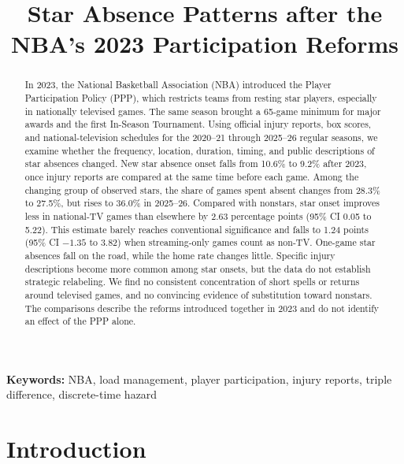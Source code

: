 \documentclass[11pt]{article}
\title{Star Absence Patterns after the NBA's 2023 Participation Reforms}
\author{}
\date{}
\begin{document}
\maketitle
\begin{abstract}
In 2023, the National Basketball Association (NBA) introduced the Player Participation Policy (PPP), which restricts teams from resting star players, especially in nationally televised games. The same season brought a 65-game minimum for major awards and the first In-Season Tournament. Using official injury reports, box scores, and national-television schedules for the 2020--21 through 2025--26 regular seasons, we examine whether the frequency, location, duration, timing, and public descriptions of star absences changed. New star absence onset falls from 10.6\% to 9.2\% after 2023, once injury reports are compared at the same time before each game. Among the changing group of observed stars, the share of games spent absent changes from 28.3\% to 27.5\%, but rises to 36.0\% in 2025--26. Compared with nonstars, star onset improves less in national-TV games than elsewhere by 2.63 percentage points (95\% CI 0.05 to 5.22). This estimate barely reaches conventional significance and falls to 1.24 points (95\% CI $-1.35$ to 3.82) when streaming-only games count as non-TV. One-game star absences fall on the road, while the home rate changes little. Specific injury descriptions become more common among star onsets, but the data do not establish strategic relabeling. We find no consistent concentration of short spells or returns around televised games, and no convincing evidence of substitution toward nonstars. The comparisons describe the reforms introduced together in 2023 and do not identify an effect of the PPP alone.
\end{abstract}

\noindent\textbf{Keywords:} NBA, load management, player participation, injury reports, triple difference, discrete-time hazard

\section{Introduction}
\end{document}
